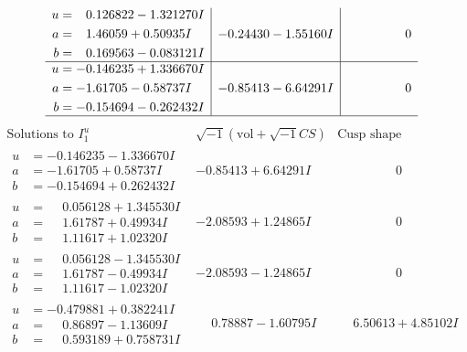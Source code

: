 \documentclass[1p]{elsarticle_modified}
\theoremstyle{definition}
\newcommand{\I}{\sqrt{-1}}
\begin{document}
$$\begin{array}{c|c|c}
\begin{aligned}
u &= \phantom{-}0.126822 - 1.321270 I \\
a &= \phantom{-}1.46059 + 0.50935 I \\
b &= \phantom{-}0.169563 - 0.083121 I\end{aligned}
 & -0.24430 - 1.55160 I & \phantom{-0.000000 } 0 \\ \hline\begin{aligned}
u &= -0.146235 + 1.336670 I \\
a &= -1.61705 - 0.58737 I \\
b &= -0.154694 - 0.262432 I\end{aligned}
 & -0.85413 - 6.64291 I & \phantom{-0.000000 } 0\\
 \hline 
 \end{array}$$\newpage$$\begin{array}{c|c|c}  
\text{Solutions to }I^u_{1}& \I (\text{vol} + \sqrt{-1}CS) & \text{Cusp shape}\\
 \hline 
\begin{aligned}
u &= -0.146235 - 1.336670 I \\
a &= -1.61705 + 0.58737 I \\
b &= -0.154694 + 0.262432 I\end{aligned}
 & -0.85413 + 6.64291 I & \phantom{-0.000000 } 0 \\ \hline\begin{aligned}
u &= \phantom{-}0.056128 + 1.345530 I \\
a &= \phantom{-}1.61787 + 0.49934 I \\
b &= \phantom{-}1.11617 + 1.02320 I\end{aligned}
 & -2.08593 + 1.24865 I & \phantom{-0.000000 } 0 \\ \hline\begin{aligned}
u &= \phantom{-}0.056128 - 1.345530 I \\
a &= \phantom{-}1.61787 - 0.49934 I \\
b &= \phantom{-}1.11617 - 1.02320 I\end{aligned}
 & -2.08593 - 1.24865 I & \phantom{-0.000000 } 0 \\ \hline\begin{aligned}
u &= -0.479881 + 0.382241 I \\
a &= \phantom{-}0.86897 - 1.13609 I \\
b &= \phantom{-}0.593189 + 0.758731 I\end{aligned}
 & \phantom{-}0.78887 - 1.60795 I & \phantom{-}6.50613 + 4.85102 I \\ \hline\begin{aligned}

\end{aligned}
\end{array}$$
\end{document}
